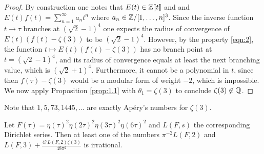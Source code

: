 \begin{proof}
    By construction one notes that $E(t) \in \mathbb{Z}\llbracket t\rrbracket$ and  and $E(t) f(t) = \sum_{n=1}^{\infty} a_n t^n$ where $a_n \in \mathbb{Z} / [1, \dots, n]^3$.
    Since the inverse function $t \to \tau$ branches at $(\sqrt{2} - 1)^{4}$ one expects the radius of convergence of $E(t)(f(t) - \zeta(3))$ to be $(\sqrt{2} - 1)^{4}$.
    However, by the property \eqref{eqn:2}, the function $t \mapsto E(t) (f(t) - \zeta(3))$ has no branch point at $t = (\sqrt{2} - 1)^4$, and its radius of convergence equals at least the next branching value, which is $(\sqrt{2} + 1)^{4}$.
    Furthermore, it cannot be a polynomial in $t$, since then $f(\tau) - \zeta(3)$ would be a modular form of weight $-2$, which is impossible.
    We now apply Proposition \ref{prop:1.1} with $\theta_1 = \zeta(3)$ to conclude $\zeta(3) \not \in \mathbb{Q}$.
\end{proof}

\begin{remark*}
    Note that $1, 5, 73, 1445, \dots$ are exactly Ap\'ery's numbers for $\zeta(3)$.
\end{remark*}

\begin{theorem}
    \label{thm:2}
    Let $F(\tau)  = \eta(\tau)^{2} \eta(2\tau)^{2} \eta(3\tau)^{2} \eta(6\tau)^2$ and $L(F, s)$ the corresponding Dirichlet series.
    Then at least one of the numbers $\pi^{-2}L(F, 2)$ and $L(F, 3) + \frac{47 L(F, 2) \zeta(3)}{48 \pi^2}$ is irrational.
\end{theorem}

